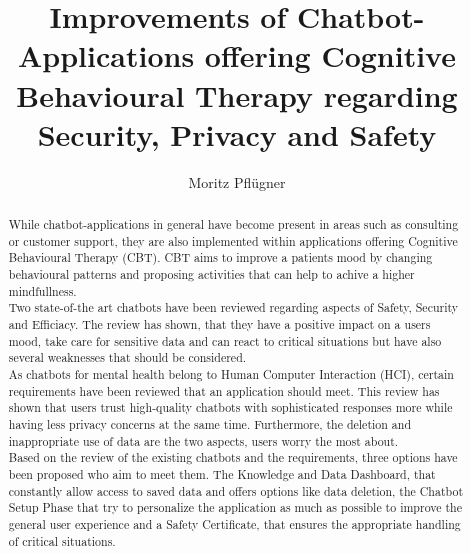 \documentclass[sigconf, nonacm]{acmart}
\begin{document}
\graphicspath{ {./images/} }

\title{Improvements of Chatbot-Applications offering Cognitive Behavioural Therapy regarding Security, Privacy and Safety}

\author{Moritz Pflügner}


\begin{abstract}
While chatbot-applications in general have become present in areas such as consulting or customer support, they are also implemented
within applications offering Cognitive Behavioural Therapy (CBT). CBT aims to improve a patients mood by changing behavioural patterns and proposing
activities that can help to achive a higher mindfullness.
\\
Two state-of-the art chatbots have been reviewed regarding aspects of Safety, Security and Efficiacy. The review has shown, that they have a positive 
impact on a users mood, take care for sensitive data and can react to critical situations but have also several weaknesses that should be considered. 
\\
As chatbots for mental health belong to Human Computer Interaction (HCI), certain requirements have been reviewed that an application should meet. This review has shown
that users trust high-quality chatbots with sophisticated responses more while having less privacy concerns at the same time. Furthermore, the deletion and 
inappropriate use of data are the two aspects, users worry the most about. 
\\
Based on the review of the existing chatbots and the requirements, three options have been proposed who aim to meet them.
The Knowledge and Data Dashboard, that constantly allow access to saved data and offers options like data deletion, 
the Chatbot Setup Phase that try to personalize the application as much as possible to improve the general user experience and 
a Safety Certificate, that ensures the appropriate handling of critical situations.   
\end{abstract}
\end{document}
